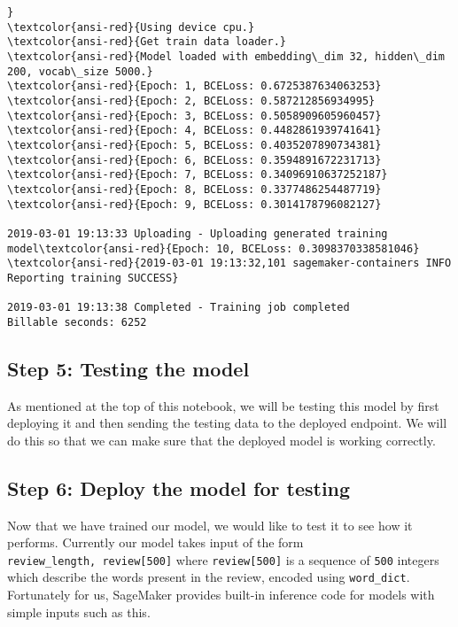 \documentclass[11pt]{article}
\begin{document}
\begin{Verbatim}[commandchars=\\\{\}]
}
\textcolor{ansi-red}{Using device cpu.}
\textcolor{ansi-red}{Get train data loader.}
\textcolor{ansi-red}{Model loaded with embedding\_dim 32, hidden\_dim 200, vocab\_size 5000.}
\textcolor{ansi-red}{Epoch: 1, BCELoss: 0.6725387634063253}
\textcolor{ansi-red}{Epoch: 2, BCELoss: 0.587212856934995}
\textcolor{ansi-red}{Epoch: 3, BCELoss: 0.5058909605960457}
\textcolor{ansi-red}{Epoch: 4, BCELoss: 0.4482861939741641}
\textcolor{ansi-red}{Epoch: 5, BCELoss: 0.4035207890734381}
\textcolor{ansi-red}{Epoch: 6, BCELoss: 0.3594891672231713}
\textcolor{ansi-red}{Epoch: 7, BCELoss: 0.34096910637252187}
\textcolor{ansi-red}{Epoch: 8, BCELoss: 0.3377486254487719}
\textcolor{ansi-red}{Epoch: 9, BCELoss: 0.3014178796082127}

2019-03-01 19:13:33 Uploading - Uploading generated training model\textcolor{ansi-red}{Epoch: 10, BCELoss: 0.3098370338581046}
\textcolor{ansi-red}{2019-03-01 19:13:32,101 sagemaker-containers INFO     Reporting training SUCCESS}

2019-03-01 19:13:38 Completed - Training job completed
Billable seconds: 6252

    \end{Verbatim}

    \hypertarget{step-5-testing-the-model}{%
\subsection{Step 5: Testing the model}\label{step-5-testing-the-model}}

As mentioned at the top of this notebook, we will be testing this model
by first deploying it and then sending the testing data to the deployed
endpoint. We will do this so that we can make sure that the deployed
model is working correctly.

\hypertarget{step-6-deploy-the-model-for-testing}{%
\subsection{Step 6: Deploy the model for
testing}\label{step-6-deploy-the-model-for-testing}}

Now that we have trained our model, we would like to test it to see how
it performs. Currently our model takes input of the form
\texttt{review\_length,\ review{[}500{]}} where \texttt{review{[}500{]}}
is a sequence of \texttt{500} integers which describe the words present
in the review, encoded using \texttt{word\_dict}. Fortunately for us,
SageMaker provides built-in inference code for models with simple inputs
such as this.
\end{document}
